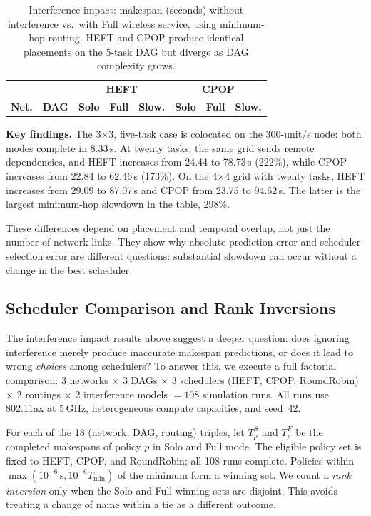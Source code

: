 \documentclass[conference]{IEEEtran}
\begin{document}
\begin{table}[t]
\centering
\caption{Interference impact: makespan (seconds) without interference vs.\
with Full wireless service, using minimum-hop routing.  HEFT and CPOP
produce identical placements on the 5-task DAG but diverge as DAG
complexity grows.}
\label{tab:interference}
\setlength{\tabcolsep}{2.5pt}
\begin{tabular}{@{}ll|rrr|rrr@{}}
\toprule
& & \multicolumn{3}{c|}{\textbf{HEFT}} & \multicolumn{3}{c}{\textbf{CPOP}} \\
\textbf{Net.} & \textbf{DAG} &
  \textbf{Solo} & \textbf{Full} & \textbf{Slow.} &
  \textbf{Solo} & \textbf{Full} & \textbf{Slow.} \\
\midrule

\bottomrule
\end{tabular}
\end{table}

\textbf{Key findings.}
The 3$\times$3, five-task case is colocated on the 300-unit/s node:
both modes complete in 8.33\,s. At twenty tasks, the same grid sends
remote dependencies, and HEFT increases from 24.44 to 78.73\,s
(222\%), while CPOP increases from 22.84 to 62.46\,s (173\%).
On the 4$\times$4 grid with twenty tasks, HEFT increases from 29.09
to 87.07\,s and CPOP from 23.75 to 94.62\,s. The latter is the
largest minimum-hop slowdown in the table, 298\%.

These differences depend on placement and temporal overlap, not just the
number of network links. They show why absolute prediction error and
scheduler-selection error are different questions: substantial slowdown
can occur without a change in the best scheduler.

\subsection{Scheduler Comparison and Rank Inversions}
\label{sec:scheduler_eval}

The interference impact results above suggest a deeper question: does
ignoring interference merely produce inaccurate makespan predictions, or
does it lead to wrong \emph{choices} among schedulers?  To answer this, we
execute a full factorial comparison: 3 networks $\times$ 3 DAGs $\times$
3 schedulers (HEFT, CPOP, RoundRobin) $\times$ 2 routings $\times$ 2
interference models $= 108$ simulation runs.  All runs use 802.11ax at
5\,GHz, heterogeneous compute capacities, and seed~42.

For each of the 18 (network, DAG, routing) triples, let $T_p^S$ and $T_p^F$
be the completed makespans of policy $p$ in Solo and Full mode. The eligible
policy set is fixed to HEFT, CPOP, and RoundRobin; all 108 runs complete.
Policies within $\max(10^{-6}\,\mathrm{s},10^{-6}T_{\min})$ of the minimum
form a winning set. We count a \emph{rank inversion} only when the Solo
and Full winning sets are disjoint. This avoids treating a change of name
within a tie as a different outcome.
\end{document}
